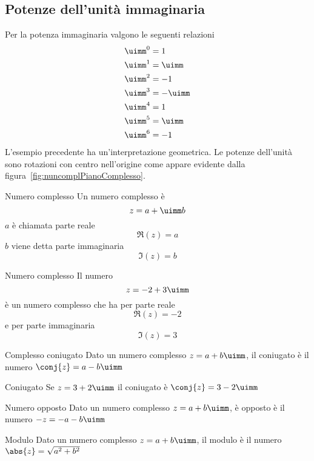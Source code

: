 \subsection{Potenze dell'unità immaginaria}
Per la potenza immaginaria valgono le seguenti relazioni
\begin{align*}
	&\uimm^0=1\\
	&\uimm^1=\uimm\\
	&\uimm^2=-1\\
	&\uimm^3=-\uimm\\
	&\uimm^4=1\\
	&\uimm^5=\uimm\\
	&\uimm^6=-1
\end{align*}
L'esempio precedente ha un'interpretazione geometrica. Le potenze dell'unità sono rotazioni  con  centro nell'origine come appare evidente dalla figura~\vref{fig:nuncomplPianoComplesso}.
\begin{definizionet}{Numero complesso}{}
	 Un numero complesso è \[z=a+\uimm b\] $a$ è chiamata parte reale \[\Re\left(z\right)=a\]
	$b$ viene detta  parte immaginaria\[\Im\left(z\right)=b \] 
\end{definizionet}
\begin{esempiot}{Numero complesso}{}
Il numero \[z=-2+3\uimm \] è un numero complesso che ha per parte reale \[\Re(z)=-2\]  e per parte immaginaria \[\Im(z)=3\]
\end{esempiot}
\begin{definizionet}{Complesso coniugato}{}
	Dato un numero complesso $z=a+b\uimm$, il coniugato è  il numero $\conj{z}=a-b\uimm$
\end{definizionet}
\begin{esempiot}{Coniugato}{}
Se $z=3+2\uimm$ il coniugato è $\conj{z}=3-2\uimm$ 
\end{esempiot}
\begin{definizionet}{Numero opposto}{}
Dato un numero complesso $z=a+b\uimm$, è opposto è il numero $-z=-a-b\uimm$
\end{definizionet}
\begin{definizionet}{Modulo}{}
Dato un numero  complesso $z=a+b\uimm$, il modulo è il numero $\abs{z}=\sqrt{a^2+b^2}$
\end{definizionet}
